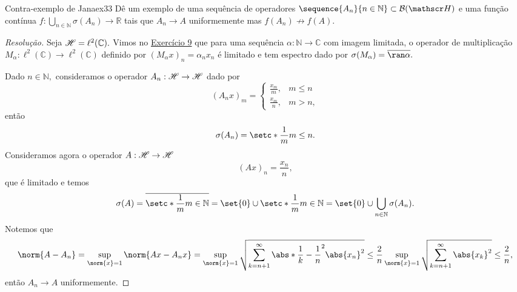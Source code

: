 \begin{exercício}{Contra-exemplo de Jana}{ex33}
  Dê um exemplo de uma sequência de operadores \(\sequence{A_n}{n\in\mathbb{N}}\subset\bounded(\hilbert)\) e uma função contínua \(f: \bigcup_{n\in \mathbb{N}} \sigma(A_n) \to \mathbb{R}\) tais que \(A_n \to A\) uniformemente mas \(f(A_n) \not\to f(A).\)
\end{exercício}
\begin{proof}[Resolução]
  Seja \(\mathscr{H} = \ell^2(\mathbb{C}).\) Vimos no \href{https://github.com/louisradial/pgf5442-teoria-espectral/releases/tag/lista2}{Exercício 9} que para uma sequência \(\alpha : \mathbb{N} \to \mathbb{C}\) com imagem limitada, o operador de multiplicação \(M_{\alpha} : \ell^2(\mathbb{C}) \to \ell^2(\mathbb{C})\) definido por \((M_{\alpha}x)_n = \alpha_n x_n\) é limitado e tem espectro dado por \(\sigma(M_\alpha) = \closure{\ran\alpha}.\)

  Dado \(n \in \mathbb{N},\) consideramos o operador \(A_n : \mathscr{H} \to \mathscr{H}\) dado por
  \begin{equation*}
    (A_nx)_m = \begin{cases}
      \frac{x_m}{m},&m \leq n\\
      \frac{x_m}{n},& m > n,
    \end{cases}
  \end{equation*}
  então
  \begin{equation*}
    \sigma(A_n) = \setc*{\frac{1}{m}}{m \leq n}.
  \end{equation*}
  Consideramos agora o operador \(A : \mathscr{H} \to \mathscr{H}\)
  \begin{equation*}
    (Ax)_n = \frac{x_n}{n},
  \end{equation*}
  que é limitado e temos
  \begin{equation*}
    \sigma(A) = \closure{\setc*{\frac{1}{m}}{m \in \mathbb{N}}} = \set{0} \cup \setc*{\frac{1}{m}}{m \in \mathbb{N}} = \set{0} \cup \bigcup_{n \in \mathbb{N}}\sigma(A_n).
  \end{equation*}
  Notemos que
  \begin{equation*}
    \norm{A - A_n} = \sup_{\norm{x} = 1} \norm{Ax - A_nx} = \sup_{\norm{x} = 1}{\sqrt{\sum_{k = n+1}^\infty \abs*{\frac{1}{k} - \frac{1}{n}}^2\abs{x_n}^2}} \leq \frac{2}{n} \sup_{\norm{x} = 1}{\sqrt{\sum_{k = n+1}^\infty\abs{x_k}^2}} \leq \frac{2}{n},
  \end{equation*}
  então \(A_n \to A\) uniformemente.


\end{proof}
